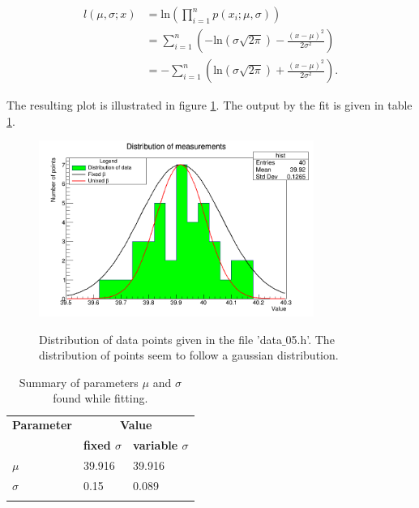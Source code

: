 \documentclass[10pt]{article}
\newenvironment{myfont}{\fontfamily{put}\selectfont}{\par}
\begin{document}
\begin{myfont}
\begin{align*}
l(\mu, \sigma; x) & = \textrm{ln}\left(\prod_{i = 1}^{n}p(x_{i}; \mu, \sigma)\right) \\
                  & = \sum_{i = 1}^{n} \left(-\textrm{ln}\left(\sigma\sqrt{2\pi}\right) - \frac{\left(x - \mu\right)^{2}}{2\sigma^{2}}\right) \\
                  & = - \sum_{i = 1}^{n} \left(\textrm{ln}\left(\sigma\sqrt{2\pi}\right) + \frac{\left(x - \mu\right)^{2}}{2\sigma^{2}}\right).
\end{align*}

The resulting plot is illustrated in figure \ref{fig:gaussian_distribution}.
The output by the fit is given in table \ref{tab:ex5_2}.

\begin{figure}[H]
  \centering
  \caption{Distribution of data points given in the file 'data$\_$05.h'.
  The distribution of points seem to follow a gaussian distribution.}
  \includegraphics[width = 0.8\textwidth]{./exercise5_2.png}
  \label{fig:gaussian_distribution}
\end{figure}

\begin{longtable}{*{3}l}
\caption{Summary of parameters $\mu$ and $\sigma$ found while fitting.}\endfirsthead
\endhead
\toprule
\textbf{Parameter} & \multicolumn{2}{c}{\textbf{Value}} \\
\cmidrule{2-3}
 & \textbf{fixed $\sigma$} & \textbf{variable $\sigma$} \\
\midrule
$\mu$    & \num{39.916} & \num{39.916} \\ 
$\sigma$ & \num{0.15}   & \num{0.089}  \\
\bottomrule
\label{tab:ex5_2}
\end{longtable}

\end{myfont}
\end{document}
